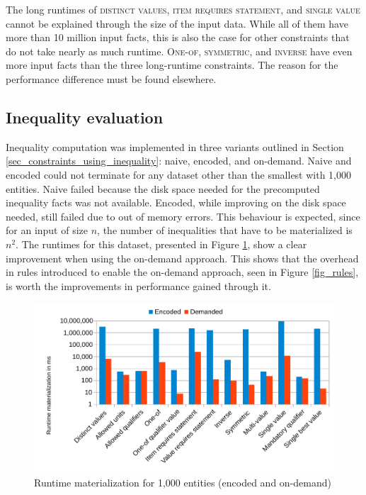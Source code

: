 \documentclass[hyperref,bachelorofscience,fleqn]{cgvpub}
\begin{document}
The long runtimes of \textsc{distinct values}, \textsc{item requires statement}, and \textsc{single value} cannot be explained through the size of the input data. While all of them have more than 10 million input facts, this is also the case for other constraints that do not take nearly as much runtime. \textsc{One-of}, \textsc{symmetric}, and \textsc{inverse} have even more input facts than the three long-runtime constraints. The reason for the performance difference must be found elsewhere.

\subsection{Inequality evaluation}\label{sec_inequality_evaluation}
Inequality computation was implemented in three variants outlined in Section \ref{sec_constraints_using_inequality}: naive, encoded, and on-demand. Naive and encoded could not terminate for any dataset other than the smallest with 1,000 entities. Naive failed because the disk space needed for the precomputed inequality facts was not available. Encoded, while improving on the disk space needed, still failed due to out of memory errors. This behaviour is expected, since for an input of size \(n\), the number of inequalities that have to be materialized is \(n^2\). The runtimes for this dataset, presented in Figure \ref{fig_inequality}, show a clear improvement when using the on-demand approach. This shows that the overhead in rules introduced to enable the on-demand approach, seen in Figure \ref{fig_rules}, is worth the improvements in performance gained through it.

\begin{figure}
\includegraphics[width=\linewidth]{images/inequality1000.pdf}
\caption{Runtime materialization for 1,000 entities (encoded and on-demand)}\label{fig_inequality}
\end{figure}
\end{document}
